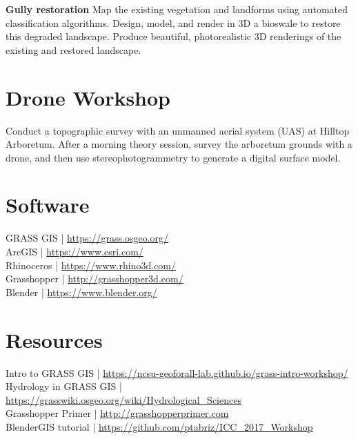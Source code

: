 \documentclass[11pt,article,oneside]{memoir}
\begin{document}
\noindent \textbf{Gully restoration}
Map the existing vegetation and landforms
using automated classification algorithms.
Design, model, and render in 3D
a bioswale to restore this degraded landscape.
Produce beautiful, photorealistic 3D renderings  
of the existing and restored landscape.\\

\section{Drone Workshop}
Conduct a topographic survey with an unmanned aerial system (UAS)
at Hilltop Arboretum. 
After a morning theory session, 
survey the arboretum grounds with a drone,
and then use stereophotogrammetry to generate a digital surface model.

\section{Software}
\begin{multicols}{2}
\raggedright
GRASS GIS | \url{https://grass.osgeo.org/} \\
ArcGIS | \url{https://www.esri.com/} \\
Rhinoceros | \url{https://www.rhino3d.com/}\\
Grasshopper | \url{http://grasshopper3d.com/}\\
Blender | \url{https://www.blender.org/}
\end{multicols}

\section{Resources}
Intro to GRASS GIS | \url{https://ncsu-geoforall-lab.github.io/grass-intro-workshop/}\\
Hydrology in GRASS GIS | \url{https://grasswiki.osgeo.org/wiki/Hydrological_Sciences}\\
Grasshopper Primer | \url{http://grasshopperprimer.com}\\
BlenderGIS tutorial | \url{https://github.com/ptabriz/ICC_2017_Workshop}
\end{document}
